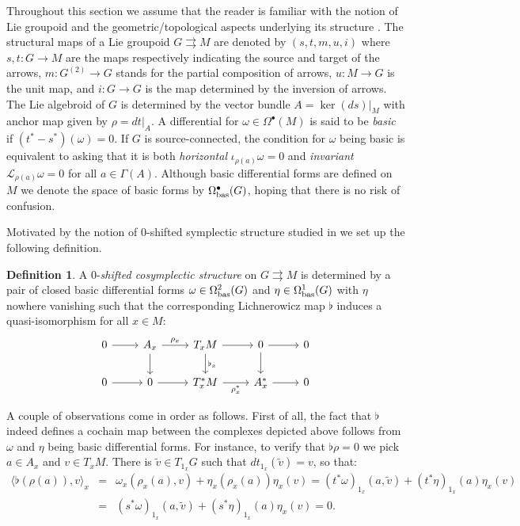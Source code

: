 \documentclass[
  a4paper, 
  reqno, 
  oneside, 
  12pt
]{amsart}
\theoremstyle{definition}
\newtheorem{definition}[theorem]{Definition}
\theoremstyle{remark}
\newcommand{\rr}{\rightrightarrows}
\begin{document}
Throughout this section we assume that the reader is familiar with the notion of Lie groupoid and the geometric/topological aspects underlying its structure \cite{delHoyo}. The structural maps of a Lie groupoid $G\rr M$ are denoted by $(s,t,m,u,i)$ where $s,t:G\to M$ are the maps respectively indicating the source and target of the arrows, $m:G^{(2)}\to G$ stands for the partial composition of arrows, $u:M\to G$ is the unit map, and $i:G\to G$ is the map determined by the inversion of arrows. The Lie algebroid of $G$ is determined by the vector bundle $A=\ker(ds)|_M$ with anchor map  given by $\rho=dt|_A$. A differential for $\omega\in \Omega^\bullet(M)$ is said to be \emph{basic} if $(t^\ast-s^\ast)(\omega)=0$. If $G$ is source-connected, the condition for $\omega$ being basic is equivalent to asking that it is both \emph{horizontal} $\iota_{\rho(a)}\omega=0$ and \emph{invariant} $\mathcal{L}_{\rho(a)}\omega=0$ for all $a\in \Gamma(A)$. Although basic differential forms are defined on $M$ we denote the space of basic forms by $\Omega_{\textnormal{bas}}^\bullet(G)$, hoping that there is no risk of confusion.

Motivated by the notion of $0$-shifted symplectic structure studied in \cite{HoffmanSjamaar} we set up the following definition.

\begin{definition}\label{def:0shifted}
A $0$-\emph{shifted cosymplectic structure} on $G\rr M$ is determined by a pair of closed basic differential forms $\omega\in \Omega_{\textnormal{bas}}^2(G)$ and $\eta\in \Omega_{\textnormal{bas}}^1(G)$ with $\eta$ nowhere vanishing such that the corresponding Lichnerowicz map $\flat$ induces a quasi-isomorphism for all $x\in M$:
\begin{equation}\label{diag:cochain}
	\begin{tikzcd}
		0 \arrow[r] & A_x \arrow[r, "\rho_x"] \arrow[d] & T_xM \arrow[r] \arrow[d, "\flat_x"] & 0 \arrow[r]  \arrow[d] & 0 \\
		0 \arrow[r] & 0 \arrow[r] & T^{\ast}_xM \arrow[r, "\rho^{\ast}_x"'] & A^{\ast}_x \arrow[r] & 0
	\end{tikzcd}
\end{equation}
\end{definition}

A couple of observations come in order as follows. First of all, the fact that $\flat$ indeed defines a cochain map between the complexes depicted above follows from $\omega$ and $\eta$ being basic differential forms. For instance, to verify that $\flat\rho=0$ we pick $a\in A_x$ and $v\in T_xM$. There is $\tilde{v}\in T_{1_x} G$ such that $dt_{1_x}(\tilde{v})=v$, so that:
\begin{eqnarray*}
	\langle \flat(\rho(a)),v \rangle_x &=& \omega_x(\rho_x(a),v)+\eta_x(\rho_x(a))\eta_x(v)=(t^*\omega)_{1_x}(a, \tilde v)+(t^*\eta)_{1_x}(a)\eta_x(v)\\
	&=& (s^*\omega)_{1_x}(a, \tilde v)+(s^*\eta)_{1_x}(a)\eta_x(v)=0.
\end{eqnarray*}
\end{document}
